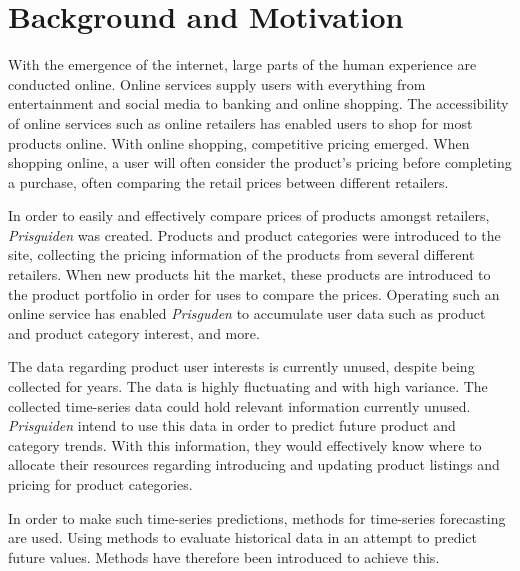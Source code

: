 \section{Background and Motivation}\label{cit}
\label{section:Introduction:BackgroundAndMotivation}


With the emergence of the internet, large parts of the human experience are conducted online.
Online services supply users with everything from entertainment and social media to banking and online shopping.
The accessibility of online services such as online retailers has enabled users to shop for most products online.
With online shopping, competitive pricing emerged.
When shopping online, a user will often consider the product's pricing before completing a purchase, often comparing the retail prices between different retailers.


In order to easily and effectively compare prices of products amongst retailers,
\textit{Prisguiden} was created.
Products and product categories were introduced to the site, collecting the pricing information of the products from several different retailers.
When new products hit the market, these products are introduced to the product portfolio in order for uses to compare the prices.
Operating such an online service has enabled \textit{Prisguden} to accumulate user data such as product and product category interest, and more.

The data regarding product user interests is currently unused, despite being collected for years.
The data is highly fluctuating and with high variance.
The collected time-series data could hold relevant information currently unused.
\textit{Prisguiden} intend to use this data in order to predict future product and category trends.
With this information, they would effectively know where to allocate their resources regarding introducing and updating product listings and pricing for product categories.
\linebreak


In order to make such time-series predictions, methods for time-series forecasting are used.
Using methods to evaluate historical data in an attempt to predict future values.
Methods have therefore been introduced to achieve this.


